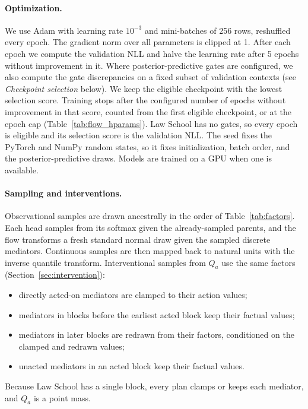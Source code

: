 \paragraph{Optimization.}
We use Adam with learning rate $10^{-3}$ and mini-batches of 256 rows,
reshuffled every epoch. The gradient norm over all parameters is clipped at 1.
After each epoch we compute the validation NLL and halve the learning rate
after 5 epochs without improvement in it. Where posterior-predictive gates are
configured, we also compute the gate discrepancies on a fixed subset of
validation contexts (see \emph{Checkpoint selection} below).
We keep the eligible checkpoint with the lowest selection score. Training
stops after the configured number of epochs without improvement in that
score, counted from the first eligible checkpoint, or at the epoch cap
(Table~\ref{tab:flow_hparams}). Law School has no gates, so every epoch is
eligible and its selection score is the validation NLL. The seed fixes the
PyTorch and NumPy random states, so it fixes initialization, batch order, and
the posterior-predictive draws. Models are trained on a GPU when one is
available.

\paragraph{Sampling and interventions.}
Observational samples are drawn ancestrally in the order of
Table~\ref{tab:factors}. Each head samples from its softmax given the
already-sampled parents, and the flow transforms a fresh standard normal draw
given the sampled discrete mediators. Continuous samples are then mapped back
to natural units with the inverse quantile transform. Interventional samples
from $Q_a$ use the same factors (Section~\ref{sec:intervention}):
\begin{itemize}[nosep]
  \item directly acted-on mediators are clamped to their action values;
  \item mediators in blocks before the earliest acted block keep their factual
        values;
  \item mediators in later blocks are redrawn from their factors, conditioned
        on the clamped and redrawn values;
  \item unacted mediators in an acted block keep their factual values.
\end{itemize}
Because Law School has a single block, every plan clamps or keeps each
mediator, and $Q_a$ is a point mass.

